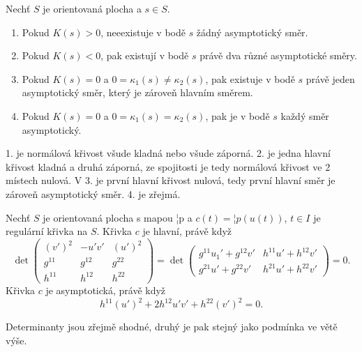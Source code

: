 \documentclass[12pt]{article}                   %
\begin{document}
        \begin{veta}
            Nechť $S$ je orientovaná plocha a $s \in S$.
            \begin{enumerate}
                \item Pokud $K(s) > 0$, neeexistuje v bodě $s$ žádný asymptotický směr.
                \item Pokud $K(s) < 0$, pak existují v bodě $s$ právě dva různé asymptotické směry.
                \item Pokud $K(s) = 0$ a $0 = \kappa_1(s) ≠ \kappa_2(s)$, pak existuje v bodě $s$ právě jeden asymptotický směr, který je zároveň hlavním směrem.
                \item Pokud $K(s) = 0$ a $0 = \kappa_1(s) = \kappa_2(s)$, pak je v bodě $s$ každý směr asymptotický.
            \end{enumerate}

            \begin{dukazin}
                1. je normálová křivost všude kladná nebo všude záporná. 2. je jedna hlavní křivost kladná a druhá záporná, ze spojitosti je tedy normálová křivost ve 2 místech nulová. V 3. je první hlavní křivost nulová, tedy první hlavní směr je zároveň asymptotický směr. 4. je zřejmá.
            \end{dukazin}
        \end{veta}

        \begin{veta}
            Nechť $S$ je orientovaná plocha s mapou ¦p a $c(t) = ¦p(u(t))$, $t \in I$ je regulární křivka na $S$. Křivka $c$ je hlavní, právě když
            $$ \det \begin{pmatrix} (v')^2 & -u'v' & (u')^2 \\ g^{11} & g^{12} & g^{22} \\ h^{11} & h^{12} & h^{22} \end{pmatrix} = \det \begin{pmatrix} g^{11}u_1' + g^{12}v' & h^{11}u' + h^{12}v' \\ g^{21}u' + g^{22}v' & h^{21}u' + h^{22}v' \end{pmatrix} = 0. $$
            Křivka $c$ je asymptotická, právě když
            $$ h^{11}(u')^2 + 2h^{12}u'v' + h^{22}(v')^2 = 0. $$ 

            \begin{dukazin}
                Determinanty jsou zřejmě shodné, druhý je pak stejný jako podmínka ve větě výše.
            \end{dukazin}
        \end{veta}
\end{document}
